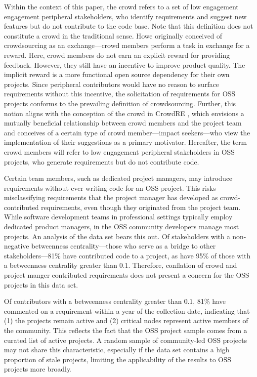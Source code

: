 Within the context of this paper, the crowd refers to a set of low engagement engagement peripheral stakeholders, who identify requirements and suggest new features but do not contribute to the code base. Note that this definition does not constitute a crowd in the traditional sense. Howe \cite{howe} originally conceived of crowdsourcing as an exchange---crowd members perform a task in exchange for a reward. Here, crowd members do not earn an explicit reward for providing feedback. However, they still have an incentive to improve product quality. The implicit reward is a more functional open source dependency for their own projects. Since peripheral contributors would have no reason to surface requirements without this incentive, the solicitation of requirements for OSS projects conforms to the prevailing definition of crowdsourcing. Further, this notion aligns with the conception of the crowd in CrowdRE \cite{groen}, which envisions a mutually beneficial relationship between crowd members and the project team and conceives of a certain type of crowd member---impact seekers---who view the implementation of their suggestions as a primary motivator. Hereafter, the term crowd members will refer to low engagement peripheral stakeholders in OSS projects, who generate requirements but do not contribute code.

Certain team members, such as dedicated project managers, may introduce requirements without ever writing code for an OSS project. This risks misclassifying requirements that the project manager has developed as crowd-contributed requirements, even though they originated from the project team. While software development teams in professional settings typically employ dedicated product managers, in the OSS community developers manage most projects. An analysis of the data set bears this out. Of stakeholders with a non-negative betweenness centrality---those who serve as a bridge to other stakeholders---81\% have contributed code to a project, as have 95\% of those with a betweenness centrality greater than $0.1$. Therefore, conflation of crowd and project manger contributed requirements does not present a concern for the OSS projects in this data set.

Of contributors with a betweenness centrality greater than $0.1$, 81\% have commented on a requirement within a year of the collection date, indicating that (1) the projects remain active and (2) critical nodes represent active members of the community. This reflects the fact that the OSS project sample comes from a curated list of active projects. A random sample of community-led OSS projects may not share this characteristic, especially if the data set contains a high proportion of stale projects, limiting the applicability of the results to OSS projects more broadly.

